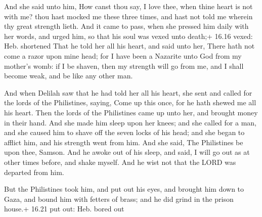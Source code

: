  And she said unto him, How canst thou say, I love thee,
when thine heart is not with me? thou hast mocked me these three times,
and hast not told me wherein thy great strength lieth.  And
it came to pass, when she pressed him daily with her words, and urged
him, so that his soul was vexed unto death;+ 16.16 vexed: Heb. shortened
 That he told her all his heart, and said unto her, There
hath not come a razor upon mine head; for I have been a Nazarite unto
God from my mother's womb: if I be shaven, then my strength will go from
me, and I shall become weak, and be like any other man.

 And when Delilah saw that he had told her all his heart,
she sent and called for the lords of the Philistines, saying, Come up
this once, for he hath shewed me all his heart. Then the lords of the
Philistines came up unto her, and brought money in their hand.
 And she made him sleep upon her knees; and she called for
a man, and she caused him to shave off the seven locks of his head; and
she began to afflict him, and his strength went from him. 
And she said, The Philistines be upon thee, Samson. And he awoke out of
his sleep, and said, I will go out as at other times before, and shake
myself. And he wist not that the LORD was departed from him.

 But the Philistines took him, and put out his eyes, and
brought him down to Gaza, and bound him with fetters of brass; and he
did grind in the prison house.+ 16.21 put out: Heb. bored out

